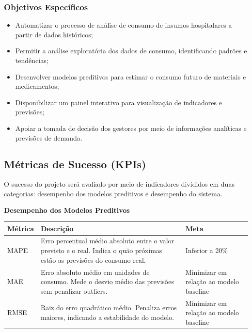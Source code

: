\documentclass[12pt,a4paper]{article}
\begin{document}
\subsubsection{Objetivos Específicos}

\begin{itemize}
\item Automatizar o processo de análise de consumo de insumos hospitalares a partir de dados históricos;
\item Permitir a análise exploratória dos dados de consumo, identificando padrões e tendências;
\item Desenvolver modelos preditivos para estimar o consumo futuro de materiais e medicamentos;
\item Disponibilizar um painel interativo para visualização de indicadores e previsões;
\item Apoiar a tomada de decisão dos gestores por meio de informações analíticas e previsões de demanda.
\end{itemize}

\subsection{Métricas de Sucesso (KPIs)}

O sucesso do projeto será avaliado por meio de indicadores divididos em 
duas categorias: desempenho dos modelos preditivos e desempenho do sistema.

\vspace{0.3cm}
\noindent\textbf{Desempenho dos Modelos Preditivos}

\begin{center}
\begin{tabular}{p{} p{} p{}}
\toprule
\textbf{Métrica} & \textbf{Descrição} & \textbf{Meta} \\
\midrule
MAPE & Erro percentual médio absoluto entre o valor previsto e o real. 
Indica o quão próximas estão as previsões do consumo real. & 
Inferior a 20\% \\
\midrule
MAE & Erro absoluto médio em unidades de consumo. 
Mede o desvio médio das previsões sem penalizar outliers. & 
Minimizar em relação ao modelo baseline \\
\midrule
RMSE & Raiz do erro quadrático médio. 
Penaliza erros maiores, indicando a estabilidade do modelo. & 
Minimizar em relação ao modelo baseline \\
\bottomrule
\end{tabular}
\end{center}
\end{document}
